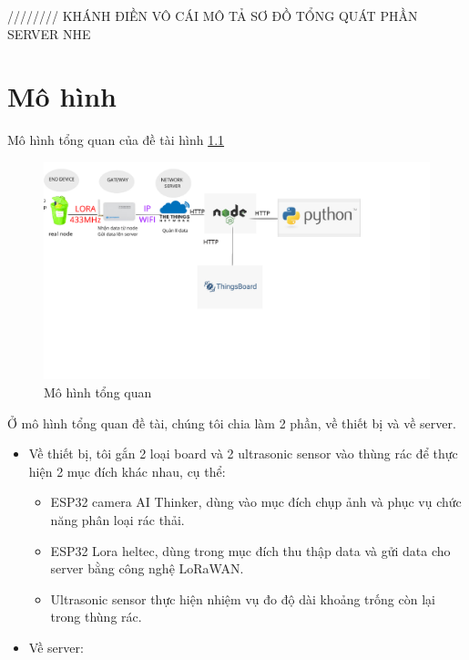 
//////// KHÁNH ĐIỀN VÔ CÁI MÔ TẢ SƠ ĐỒ TỔNG QUÁT PHẦN SERVER NHE
 







\chapter{ Mô hình}

Mô hình tổng quan của đề tài hình \ref{fig:general_chart}
\begin{figure}[H]
    \centering
    \includegraphics[width=\textwidth]{images/Quanh/general_chart.png}
    \caption{Mô hình tổng quan}
    \label{fig:general_chart}
\end{figure}
Ở mô hình tổng quan đề tài, chúng tôi chia làm 2 phần, về thiết bị và về server.

\begin{itemize}
    \item Về thiết bị, tôi gắn 2 loại board và 2 ultrasonic sensor vào thùng rác để thực hiện 2 mục đích khác nhau, cụ thể:
        \begin{itemize}
            \item ESP32 camera AI Thinker, dùng vào mục đích chụp ảnh và phục vụ chức năng phân loại rác thải.
            \item  ESP32 Lora heltec, dùng trong mục đích thu thập data và gửi data cho server bằng công nghệ LoRaWAN.
            \item Ultrasonic sensor thực hiện nhiệm vụ đo độ dài khoảng trống còn lại trong thùng rác.
        \end{itemize}

    \item Về server:

   

\end{itemize}


